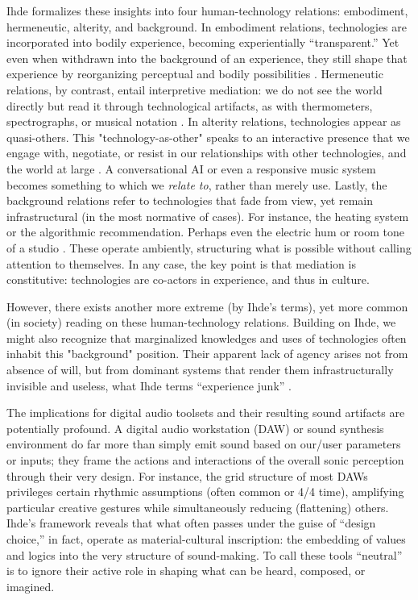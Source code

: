 Ihde formalizes these insights into four human-technology relations: embodiment, hermeneutic, alterity, and background. In embodiment relations, technologies are incorporated into bodily experience, becoming experientially “transparent.” Yet even when withdrawn into the background of an experience, they still shape that experience by reorganizing perceptual and bodily possibilities \parencite[pp. 72-74]{Ihde_1990}. Hermeneutic relations, by contrast, entail interpretive mediation: we do not see the world directly but read it through technological artifacts, as with thermometers, spectrographs, or musical notation \parencite[pp. 84-93]{Ihde_1990}. In alterity relations, technologies appear as quasi-others. This "technology-as-other" speaks to an interactive presence that we engage with, negotiate, or resist in our relationships with other technologies, and the world at large \parencite[pp. 97-99]{Ihde_1990}. A conversational AI or even a responsive music system becomes something to which we \textit{relate to}, rather than merely use. Lastly, the background relations refer to technologies that fade from view, yet remain infrastructural (in the most normative of cases). For instance, the heating system or the algorithmic recommendation. Perhaps even the electric hum or room tone of a studio \parencite[pp. 108-112]{Ihde_1990}. These operate ambiently, structuring what is possible without calling attention to themselves. In any case, the key point is that mediation is constitutive: technologies are co-actors in experience, and thus in culture.

However, there exists another more extreme (by Ihde's terms), yet more common (in society) reading on these human-technology relations. Building on Ihde, we might also recognize that marginalized knowledges and uses of technologies often inhabit this "background" position. Their apparent lack of agency arises not from absence of will, but from dominant systems that render them infrastructurally invisible and useless, what Ihde terms “experience junk” \parencite[p. 108]{Ihde_1990}.

The implications for digital audio toolsets and their resulting sound artifacts are potentially profound. A digital audio workstation (DAW) or sound synthesis environment do far more than simply emit sound based on our/user parameters or inputs; they frame the actions and interactions of the overall sonic perception through their very design. For instance, the grid structure of most DAWs privileges certain rhythmic assumptions (often common or 4/4 time), amplifying particular creative gestures while simultaneously reducing (flattening) others. Ihde’s framework reveals that what often passes under the guise of “design choice,” in fact, operate as material-cultural inscription: the embedding of values and logics into the very structure of sound-making. To call these tools “neutral” is to ignore their active role in shaping what can be heard, composed, or imagined.

